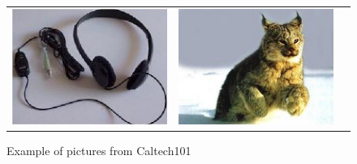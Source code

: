 \begin{figure}[h]
{\begin{tabular}{c c c}
\includegraphics[scale=0.2]{./pictures/caltech_5.jpg} &
\includegraphics[scale=0.2]{./pictures/caltech_6.jpg}
\end{tabular}
}
\caption{Example of pictures from Caltech101}
\end{figure}


